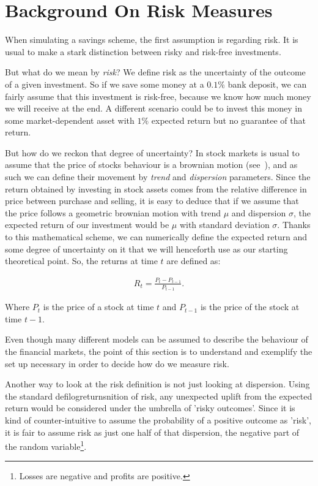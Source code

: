 \section{Background On Risk Measures} \label{sec:risk}

When simulating a savings scheme, the first assumption is regarding risk. It is usual to make a stark distinction between risky and risk-free investments.

But what do we mean by \textit{risk}? We define risk as the uncertainty of the outcome of a given investment. So if we save some money at a $0.1 \%$ bank deposit, we can fairly assume that this investment is risk-free, because we know how much money we will receive at the end. A different scenario could be to invest this money in some market-dependent asset with $1 \%$ expected return but no guarantee of that return.

But how do we reckon that degree of uncertainty? In stock markets is usual to assume that the price of stocks behaviour is a brownian motion (see~\cite{b:cootner-random, a:samuelson-speculative}), and as such we can define their movement by \textit{trend} and \textit{dispersion} parameters. Since the return obtained by investing in stock assets comes from the relative difference in price between purchase and selling, it is easy to deduce that if we assume that the price follows a geometric brownian motion with trend $\mu$ and dispersion $\sigma$, the expected return of our investment would be $\mu$ with standard deviation $\sigma$. Thanks to this mathematical scheme, we can numerically define the expected return and some degree of uncertainty on it that we will henceforth use as our starting theoretical point. So, the returns at time $t$ are defined as:

\begin{align} \label{eq:return}
    R_t = \frac{P_t - P_{t-1}}{P_{t-1}}\textit{.}
\end{align}

Where $P_t$ is the price of a stock at time $t$ and $P_{t-1}$ is the price of the stock at time $t-1$.

Even though many different models can be assumed to describe the behaviour of the financial markets, the point of this section is to understand and exemplify the set up necessary in order to decide how do we measure risk.

Another way to look at the risk definition is not just looking at dispersion. Using the standard defilogreturnsnition of risk, any unexpected uplift from the expected return would be considered under the umbrella of 'risky outcomes'. Since it is kind of counter-intuitive to assume the probability of a positive outcome as 'risk', it is fair to assume risk as just one half of that dispersion, the negative part of the random variable\footnote{Losses are negative and profits are positive.}.

